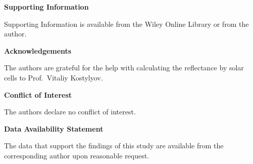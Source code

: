 \documentclass{WileyMSP-template}
\begin{document}
\medskip
\textbf{Supporting Information} \par %
Supporting Information is available from the Wiley Online Library or from the author.



\medskip
\textbf{Acknowledgements} \par %
The authors are grateful for the help with calculating the reflectance by solar cells to Prof.~Vitaliy Kostylyov.

\medskip
\textbf{Conflict of Interest}\par
The authors declare no conflict of interest.

\medskip
\textbf{Data Availability Statement}\par
The data that support the findings of this study are available from the corresponding author upon reasonable request.
\medskip







\end{document}
